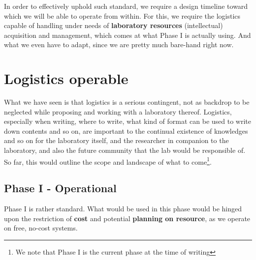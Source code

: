 \documentclass[10pt,a4paper]{article}
\begin{document}
In order to effectively uphold such standard, we require a design timeline toward which we will be able to operate from within. For this, we require the logistics capable of handling under needs of \textbf{laboratory resources} (intellectual) acquisition and management, which comes at what Phase I is actually using. And what we even have to adapt, since we are pretty much bare-hand right now. 

\section{Logistics operable}

What we have seen is that logistics is a serious contingent, not as backdrop to be neglected while proposing and working with a laboratory thereof. Logistics, especially when writing, where to write, what kind of format can be used to write down contents and so on, are important to the continual existence of knowledges and so on for the laboratory itself, and the researcher in companion to the laboratory, and also the future community that the lab would be responsible of. So far, this would outline the scope and landscape of what to come\footnote{We note that Phase I is the current phase at the time of writing}.

\subsection{Phase I - Operational}

Phase I is rather standard. What would be used in this phase would be hinged upon the restriction of \textbf{cost} and potential \textbf{planning on resource}, as we operate on free, no-cost systems. 
\end{document}
